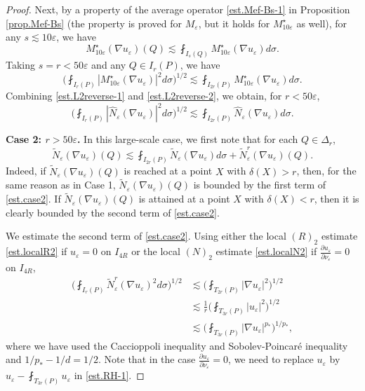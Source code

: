 \documentclass[reqno,12pt]{amsart} %
\theoremstyle{definition}
\theoremstyle{remark}
\numberwithin{equation}{section}
\newcommand{\e}{\varepsilon}
\begin{document}
\begin{proof}
Next, by a property of the average operator \eqref{est.Mef-Bs-1} in Proposition \ref{prop.Mef-Bs} (the property is proved for $M_\e$, but it holds for $M_{10\e}^\star$ as well), for any $s \lesssim 10 \e$, we have
\begin{equation}
    M_{10\e}^\star(\nabla u_\e)(Q) \lesssim \fint_{I_s(Q)} M_{10\e}^\star(\nabla u_\e) d\sigma.
\end{equation}
Taking $s = r < 50\e$ and any $Q\in I_r(P)$, we have
\begin{equation}\label{est.L2reverse-2}
    \bigg( \fint_{I_r(P)} |M_{10\e}^\star(\nabla u_\e)|^2 d\sigma  \bigg)^{1/2} \lesssim \fint_{I_{2r}(P)} M_{10\e}^\star(\nabla u_\e) d\sigma.
\end{equation}
Combining \eqref{est.L2reverse-1} and \eqref{est.L2reverse-2}, we obtain, for $r<50\e$,
\begin{equation}
    \bigg( \fint_{I_r(P)} |\widehat{N}_\e(\nabla u_\e)|^2 d\sigma  \bigg)^{1/2} \lesssim \fint_{I_{2r}(P)} \widehat{N}_\e(\nabla u_\e) d\sigma.
\end{equation}

\textbf{Case 2: $r>50\e$.} In this large-scale case, we first note that for each $Q\in \Delta_r$,
\begin{equation}\label{est.case2}
    \widetilde{N}_\e(\nabla u_\e)(Q) \lesssim \fint_{I_{2r}(P)} \widetilde{N}_\e(\nabla u_\e) d\sigma + \widetilde{N}_\e^r(\nabla u_\e)(Q).
\end{equation}
Indeed, if  $\widetilde{N}_\e(\nabla u_\e)(Q)$ is reached at a point $X$ with $\delta(X) > r$, then, for the same reason as in Case 1, $\widetilde{N}_\e(\nabla u_\e)(Q)$ is bounded by the first term of \eqref{est.case2}. If $\widetilde{N}_\e(\nabla u_\e)(Q)$ is attained at a point $X$ with $\delta(X)<r$, then it is clearly bounded by the second term of \eqref{est.case2}.

We estimate the second term of \eqref{est.case2}.
Using either the local $(R)_2$ estimate \eqref{est.localR2} if $u_\e = 0$ on $I_{4R}$ or the local $(N)_2$ estimate \eqref{est.localN2} if $\frac{\partial u_\e}{\partial \nu_\e} = 0$ on $I_{4R}$,
\begin{equation}\label{est.RH-1}
\begin{aligned}
    \bigg( \fint_{I_r(P)} \widetilde{N}_\e^r(\nabla u_\e)^2 d\sigma \bigg)^{1/2} 
    &\lesssim  \bigg( \fint_{T_{2r}(P)} |\nabla u_\e|^2 \bigg)^{1/2} \\
    & \lesssim  \frac{1}{r} \bigg( \fint_{T_{3r}(P)} |u_\e|^2 \bigg)^{1/2} \\
    & \lesssim  \bigg( \fint_{T_{3r}(P)} |\nabla u_\e|^{p_*} \bigg)^{1/p_*},
\end{aligned}
\end{equation}
where we have used the Caccioppoli inequality and Sobolev-Poincar\'{e} inequality and $1/p_* - 1/d = 1/2$. Note that in the case $\frac{\partial u_\e}{\partial \nu_\e}=0$, we need to replace $u_\e$ by $u_\e-\fint_{T_{3r}(P)} u_\e$ in \eqref{est.RH-1}.


\end{proof}
\end{document}
